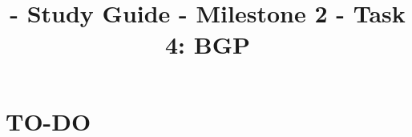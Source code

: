 

\title{\SM{} - Study Guide - Milestone 2 - Task 4: BGP}

\maketitle
\tableofcontents

\section{TO-DO}
